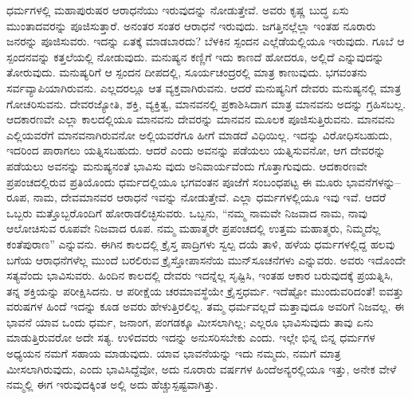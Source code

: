 ಧರ್ಮಗಳಲ್ಲಿ ಮಹಾಪುರುಷರ ಆರಾಧನೆಯು ಇರುವುದನ್ನು ನೋಡುತ್ತೇವೆ. ಅವರು ಕೃಷ್ಣ ಬುದ್ಧ ಏಸು ಮುಂತಾದವರನ್ನು ಪೂಜಿಸುತ್ತಾರೆ. ಅನಂತರ ಸಂತರ ಆರಾಧನೆ ಇರುವುದು. ಜಗತ್ತಿನಲ್ಲೆಲ್ಲಾ ಇಂತಹ ನೂರಾರು ಜನರನ್ನು ಪೂಜಿಸುವರು. ಇದನ್ನು ಏತಕ್ಕೆ ಮಾಡಬಾರದು? ಬೆಳಕಿನ ಸ್ಪಂದನ ಎಲ್ಲೆಡೆಯಲ್ಲಿಯೂ ಇರುವುದು. ಗೂಬೆ ಆ ಸ್ಪಂದನವನ್ನು ಕತ್ತಲೆಯಲ್ಲಿ ನೋಡುವುದು. ಮನುಷ್ಯನ ಕಣ್ಣಿಗೆ ಇದು ಕಾಣದೆ ಹೋದರೂ, ಅಲ್ಲಿದೆ ಎನ್ನುವುದನ್ನು ತೋರುವುದು. ಮನುಷ್ಯರಿಗೆ ಆ ಸ್ಪಂದನ ದೀಪದಲ್ಲಿ, ಸೂರ್ಯಚಂದ್ರರಲ್ಲಿ ಮಾತ್ರ ಕಾಣುವುದು. ಭಗವಂತನು ಸರ್ವವ್ಯಾಪಿಯಾಗಿರುವನು. ಎಲ್ಲದರಲ್ಲೂ ಆತ ವ್ಯಕ್ತವಾಗಿರುವನು. ಆದರೆ ಮನುಷ್ಯನಿಗೆ ದೇವರು ಮನುಷ್ಯನಲ್ಲಿ ಮಾತ್ರ ಗೋಚರಿಸುವನು. ದೇವರಜ್ಯೋತಿ, ಶಕ್ತಿ, ವ್ಯಕ್ತಿತ್ವ, ಮಾನವನಲ್ಲಿ ಪ್ರಕಾಶಿಸಿದಾಗ ಮಾತ್ರ ಮಾನವನು ಅದನ್ನು ಗ್ರಹಿಸಬಲ್ಲ. ಆದಕಾರಣವೇ ಎಲ್ಲಾ ಕಾಲದಲ್ಲಿಯೂ ಮಾನವನು ದೇವರನ್ನು ಮಾನವನ ಮೂಲಕ ಪೂಜಿಸುತ್ತಿರುವನು. ಮಾನವನು ಎಲ್ಲಿಯವರೆಗೆ ಮಾನವನಾಗಿರುವನೋ ಅಲ್ಲಿಯವರೆಗೂ ಹೀಗೆ ಮಾಡದೆ ವಿಧಿಯಿಲ್ಲ. ಇದನ್ನು ವಿರೋಧಿಸಬಹುದು, ಇದರಿಂದ ಪಾರಾಗಲು ಯತ್ನಿಸಬಹುದು. ಆದರೆ ಎಂದು ಅವನನ್ನು ಪಡೆಯಲು ಯತ್ನಿಸುವನೋ, ಆಗ ದೇವರನ್ನು ಪಡೆಯಲು ಅವನನ್ನು ಮನುಷ್ಯನಂತೆ ಭಾವಿಸು ವುದು ಅನಿವಾರ್ಯವೆಂದು ಗೊತ್ತಾಗುವುದು. ಆದಕಾರಣವೇ ಪ್ರಪಂಚದಲ್ಲಿರುವ ಪ್ರತಿಯೊಂದು ಧರ್ಮದಲ್ಲಿಯೂ ಭಗವಂತನ ಪೂಜೆಗೆ ಸಂಬಂಧಪಟ್ಟ ಈ ಮೂರು ಭಾವನೆಗಳನ್ನು–ರೂಪ, ನಾಮ, ದೇವಮಾನವರ ಆರಾಧನೆ ಇವನ್ನು ನೋಡುತ್ತೇವೆ. ಎಲ್ಲಾ ಧರ್ಮಗಳಲ್ಲಿಯೂ ಇವು ಇವೆ. ಆದರೆ ಒಬ್ಬರು ಮತ್ತೊಬ್ಬರೊಂದಿಗೆ ಹೋರಾಡಲಿಚ್ಛಿಸುವರು. ಒಬ್ಬನು, “ನಮ್ಮ ನಾಮವೇ ನಿಜವಾದ ನಾಮ, ನಾವು ಆಲೋಚಿಸುವ ರೂಪವೇ ನಿಜವಾದ ರೂಪ. ನಮ್ಮ ಮಹಾತ್ಮರೇ ಪ್ರಪಂಚದಲ್ಲಿ ಉತ್ತಮ ಮಹಾತ್ಮರು, ನಿಮ್ಮದೆಲ್ಲ ಕಂತೆಪುರಾಣ” ಎನ್ನುವನು. ಈಗಿನ ಕಾಲದಲ್ಲಿ ಕ್ರೈಸ್ತ ಪಾದ್ರಿಗಳು ಸ್ವಲ್ಪ ದಯೆ ತಾಳಿ, ಹಳೆಯ ಧರ್ಮಗಳಲ್ಲಿದ್ದ ಹಲವು ಬಗೆಯ ಆರಾಧನೆಗಳೆಲ್ಲ ಮುಂದೆ ಬರಲಿರುವ ಕ್ರೈಸ್ತೋಪಾಸನೆಯ ಮುನ್​ಸೂಚನೆಗಳು ಎನ್ನುವರು. ಅವರು ಇದೊಂದೇ ಸತ್ಯವೆಂದು ಭಾವಿಸುವರು. ಹಿಂದಿನ ಕಾಲದಲ್ಲಿ ದೇವರು ಇದನ್ನೆಲ್ಲ ಸೃಷ್ಟಿಸಿ, ಇಂತಹ ಆಕಾರ ಬರುವುದಕ್ಕೆ ಪ್ರಯತ್ನಿಸಿ, ತನ್ನ ಶಕ್ತಿಯನ್ನು ಪರೀಕ್ಷಿಸಿದನು. ಆ ಪರೀಕ್ಷೆಯ ಚರಮಾವಸ್ಥೆಯೇ ಕ್ರೈಸ್ತಧರ್ಮ. ಇದೆಷ್ಟೋ ಮುಂದುವರಿದಂತೆ! ಐವತ್ತು ವರುಷ\-ಗಳ ಹಿಂದೆ ಇದನ್ನು ಕೂಡ ಅವರು ಹೇಳುತ್ತಿರಲಿಲ್ಲ. ತಮ್ಮ ಧರ್ಮವಲ್ಲದೆ ಮತ್ತಾವುದೂ ಅವರಿಗೆ ನಿಜವಲ್ಲ. ಈ ಭಾವನೆ ಯಾವ ಒಂದು ಧರ್ಮ, ಜನಾಂಗ, ಪಂಗಡಕ್ಕೂ ಮೀಸಲಾಗಿಲ್ಲ; ಎಲ್ಲರೂ ಭಾವಿಸುವುದು ತಾವು ಏನು ಮಾಡುತ್ತಿರುವರೋ ಅದೇ ಸತ್ಯ. ಉಳಿದವರು ಇದನ್ನು ಅನುಸರಿಸಬೇಕು ಎಂದು. ಇಲ್ಲೇ ಭಿನ್ನ ಬಿನ್ನ ಧರ್ಮಗಳ ಅಧ್ಯಯನ ನಮಗೆ ಸಹಾಯ ಮಾಡುವುದು. ಯಾವ ಭಾವನೆಯನ್ನು ಇದು ನಮ್ಮದು, ನಮಗೆ ಮಾತ್ರ ಮೀಸಲಾಗಿರುವುದು, ಎಂದು ಭಾವಿಸಿದ್ದೆವೋ, ಅದು ನೂರಾರು ವರ್ಷಗಳ ಹಿಂದೆ\break ಅನ್ಯರಲ್ಲಿಯೂ ಇತ್ತು, ಅನೇಕ ವೇಳೆ ನಮ್ಮಲ್ಲಿ ಈಗ ಇರುವುದಕ್ಕಿಂತ ಅಲ್ಲಿ ಅದು ಹೆಚ್ಚು\break ಸ್ಪಷ್ಟವಾಗಿತ್ತು.

